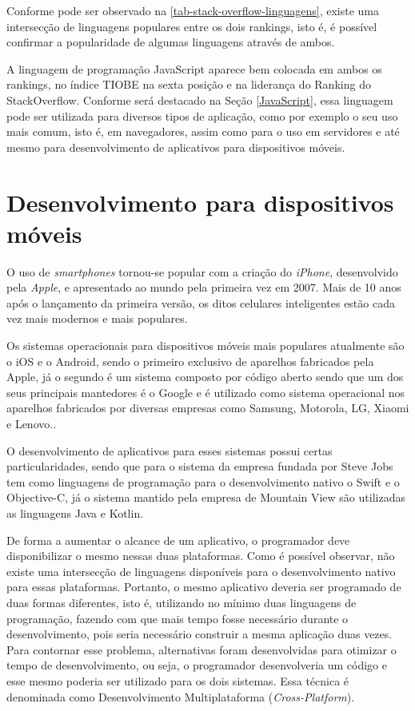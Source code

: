 \newpage
Conforme pode ser observado na \autoref{tab-stack-overflow-linguagens}, existe uma intersecção de linguagens populares entre os dois rankings, isto é, é possível confirmar a popularidade de algumas linguagens através de ambos.

A linguagem de programação JavaScript aparece bem colocada em ambos os rankings, no índice TIOBE\cite{tiobeDefinition} na sexta posição e na liderança do Ranking do StackOverflow\cite{stackOverflowRanking}. Conforme será destacado na Seção \ref{JavaScript}, essa linguagem pode ser utilizada para diversos tipos de aplicação, como por exemplo o seu uso mais comum, isto é, em navegadores, assim como para o uso em servidores e até mesmo para desenvolvimento de aplicativos para dispositivos móveis.

\section{Desenvolvimento para dispositivos móveis}
\label{sec-desenvolvimento-apps}

O uso de \textit{smartphones} tornou-se popular com a criação do \textit{iPhone}, desenvolvido pela \textit{Apple}, e apresentado ao mundo pela primeira vez em 2007. Mais de 10 anos após o lançamento da primeira versão, os ditos celulares inteligentes estão cada vez mais modernos e mais populares.\cite{iphoneApple}


Os sistemas operacionais para dispositivos móveis mais populares atualmente são o iOS e o Android, sendo o primeiro exclusivo de aparelhos fabricados pela Apple, já o segundo é um sistema composto por código aberto sendo que um dos seus principais mantedores é o Google e é utilizado como sistema operacional nos aparelhos fabricados por diversas empresas como Samsung, Motorola, LG, Xiaomi e Lenovo.\cite{androidPhonesTablets}.

O desenvolvimento de aplicativos para esses sistemas possui certas particularidades, sendo que para o sistema da empresa fundada por Steve Jobs tem como linguagens de programação para o desenvolvimento nativo o Swift e o Objective-C, já o sistema mantido pela empresa de Mountain View são utilizadas as linguagens Java e Kotlin.\cite{desenvolvimentoMobile}

De forma a aumentar o alcance de um aplicativo, o programador deve disponibilizar o mesmo nessas duas plataformas. Como é possível observar, não existe uma intersecção de linguagens disponíveis para o desenvolvimento nativo para essas plataformas. Portanto, o mesmo aplicativo deveria ser programado de duas formas diferentes, isto é, utilizando no mínimo duas linguagens de programação, fazendo com que mais tempo fosse necessário durante o desenvolvimento, pois seria necessário construir a mesma aplicação duas vezes. Para contornar esse problema, alternativas foram desenvolvidas para otimizar o tempo de desenvolvimento, ou seja, o programador desenvolveria um código e esse mesmo poderia ser utilizado para os dois sistemas. Essa técnica é denominada como Desenvolvimento Multiplataforma (\textit{Cross-Platform}).\cite{desenvolvimentoMobile}


